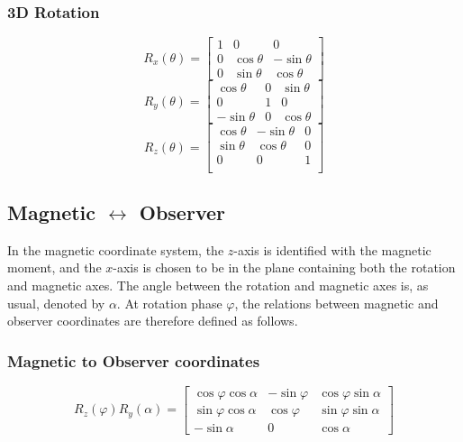 \documentclass{article}
\newcommand{\phase}{\varphi}
\begin{document}
\subsubsection{3D Rotation}
\begin{equation}
    R_x(\theta) = \begin{bmatrix}
        1 & 0 & 0 \\
        0 & \cos\theta & -\sin\theta \\
        0 & \sin\theta & \cos\theta
    \end{bmatrix}
\end{equation}
\begin{equation}
    R_y(\theta) = \begin{bmatrix}
        \cos\theta & 0 & \sin\theta \\
        0 & 1 & 0 \\
        -\sin\theta & 0 & \cos\theta
    \end{bmatrix}
\end{equation}
\begin{equation}
    R_z(\theta) = \begin{bmatrix}
        \cos\theta & -\sin\theta & 0 \\
        \sin\theta & \cos\theta & 0 \\
        0 & 0 & 1 \\
    \end{bmatrix}
\end{equation}

\subsection{Magnetic $\leftrightarrow$ Observer}

In the magnetic coordinate system, the $z$-axis is identified with the magnetic moment, and the $x$-axis is chosen to be in the plane containing both the rotation and magnetic axes.
The angle between the rotation and magnetic axes is, as usual, denoted by $\alpha$.
At rotation phase $\phase$, the relations between magnetic and observer coordinates are therefore defined as follows.

\subsubsection{Magnetic to Observer coordinates}
\begin{equation}
    R_z(\phase) R_y(\alpha) =
    \begin{bmatrix}
        \cos\phase\cos\alpha & -\sin\phase & \cos\phase\sin\alpha \\
        \sin\phase\cos\alpha &  \cos\phase & \sin\phase\sin\alpha \\
        -\sin\alpha          & 0           & \cos\alpha
    \end{bmatrix}
\end{equation}
\end{document}
